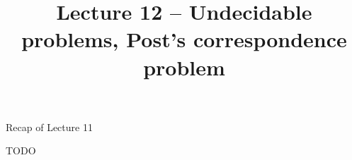 \documentclass[handout]{beamer}
\title{Lecture 12 -- Undecidable problems, Post's correspondence problem}
\begin{document}
\frame{\titlepage}


\begin{frame}{Recap of Lecture 11}
	
    TODO
	
\end{frame}
\end{document}
